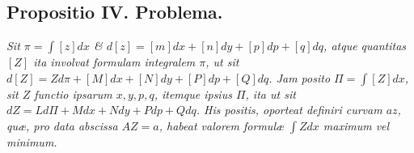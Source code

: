 \subsection*{Propositio IV. Problema.}
 \textit{Sit $\pi=\int[z]dx$ \& $d[z]=[m]dx+[n]dy+[p]dp+[q]dq$, atque quantitas $[Z]$ ita involvat formulam integralem $\pi$, ut sit $d[Z]=Z d\pi+[M]dx+[N]dy+[P]dp+[Q]dq$. Jam posito $\Pi=\int[Z]dx$, sit $Z$ functio ipsarum $x,y,p,q$, itemque ipsius $\Pi$, ita ut sit $dZ=Ld\Pi+Mdx+Ndy+Pdp+Qdq$. His positis, oporteat definiri curvam $az$, quæ, pro data abscissa $AZ=a$, habeat valorem formulæ $\int Zdx$ maximum vel minimum.}
